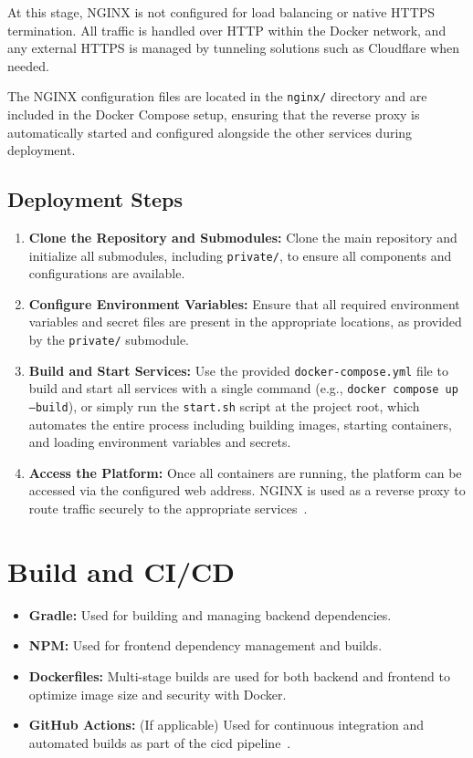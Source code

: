 At this stage, NGINX is not configured for load balancing or native HTTPS termination. All traffic is handled over HTTP within the Docker network, and any external HTTPS is managed by tunneling solutions such as Cloudflare when needed.

The NGINX configuration files are located in the \texttt{nginx/} directory and are included in the Docker Compose setup, ensuring that the reverse proxy is automatically started and configured alongside the other services during deployment.

\subsection{Deployment Steps} \label{subsec:deployment_steps}

\begin{enumerate}
    \item \textbf{Clone the Repository and Submodules:} Clone the main repository and initialize all submodules, including \texttt{private/}, to ensure all components and configurations are available.
    \item \textbf{Configure Environment Variables:} Ensure that all required environment variables and secret files are present in the appropriate locations, as provided by the \texttt{private/} submodule.
    \item \textbf{Build and Start Services:} Use the provided \texttt{docker-compose.yml} file to build and start all services with a single command (e.g., \texttt{docker compose up --build}), or simply run the \texttt{start.sh} script at the project root, which automates the entire process including building images, starting containers, and loading environment variables and secrets.
    \item \textbf{Access the Platform:} Once all containers are running, the platform can be accessed via the configured web address. NGINX is used as a reverse proxy to route traffic securely to the appropriate services~\cite{nginx-docs}.
\end{enumerate}

\section{Build and CI/CD} \label{sec:build_cicd}

\begin{itemize}
    \item \textbf{Gradle:} Used for building and managing backend dependencies.
    \item \textbf{NPM:} Used for frontend dependency management and builds.
    \item \textbf{Dockerfiles:} Multi-stage builds are used for both backend and frontend to optimize image size and security with Docker.
    \item \textbf{GitHub Actions:} (If applicable) Used for continuous integration and automated builds as part of the \ac{cicd} pipeline~\cite{github-actions-docs}.
\end{itemize}

